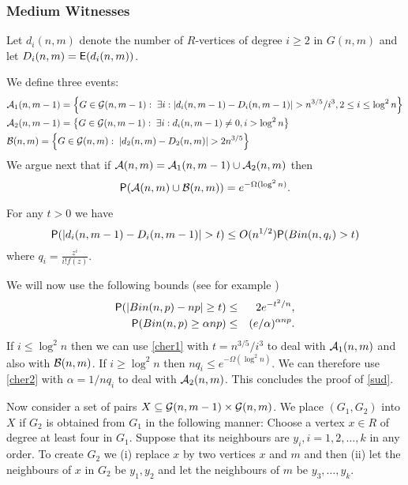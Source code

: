 \documentclass[11pt]{article}
\def\cA{{\cal A}}
\def\a{\alpha}
\newcommand{\set}[1]{\left\{#1\right\}}
\def\E{{\sf E}}
\def\Pr{{\sf P}}
\def\cB{{\cal B}}
\def\cG{{\cal G}}
\newcommand{\beq}[1]{\begin{equation}\label{#1}}
\newcommand{\eeq}{\end{equation}}
\def\go{{3/5}}
\begin{document}
\subsubsection{Medium Witnesses}
Let $d_i(n,m)$ denote the number of $R$-vertices of degree $i\geq 2$ in $G(n,m)$ and let $D_i(n,m)=\E(d_i(n,m))$.

We define three events: \begin{align}
&\cA_1(n,m-1)=\set{G\in \cG(n,m-1):\;\exists i:|d_i(n,m-1)-D_i(n,m-1)|> 
n^{\go}/i^3, 2\leq i\leq \log^2n}
\label{bad1}\\
&\cA_2(n,m-1)=\set{G\in \cG(n,m-1):\;\exists i:d_i(n,m-1)\neq 0, 
 i> \log^2n}
\label{bad1a}\\
&\cB(n,m)=\set{G\in \cG(n,m):\;|d_2(n,m)-D_2(n,m)|> 2n^{\go}}\label{bad2}
\end{align}
We argue next that if $\cA(n,m)=\cA_1(n,m-1)\cup\cA_2(n,m)$ then
\beq{sud}
\Pr(\cA(n,m)\cup \cB(n,m))=e^{-\Omega(\log^2n)}.
\eeq

For any $t>0$ we have
$$\Pr(|d_i(n,m-1)-D_i(n,m-1)|> t)\leq O(n^{1/2})\Pr(Bin(n,q_i) > t)$$
where $q_i=\frac{z^i}{i!f(z)}$.

We will now use the following bounds (see for example \cite{AS})
\begin{eqnarray}
\Pr(|Bin(n,p)-np|\geq t)&\leq& 2e^{-t^2/n},\label{cher1}\\
\Pr(Bin(n,p)\geq \a np)&\leq &(e/\a)^{\a np}.\label{cher2}
\end{eqnarray}
If $i\leq \log^2n$ then we can use \eqref{cher1} with $t=n^{\go}/i^3$ to deal with $\cA_1(n,m)$ and also with $\cB(n,m)$.
If $i\geq \log^2n$ then $nq_i\leq e^{-\Omega(\log^2n)}$. We can therefore use \eqref{cher2} with $\a=1/nq_i$ to deal with 
$\cA_2(n,m)$. This concludes the proof of \eqref{sud}.

Now consider a set of pairs $X\subseteq \cG(n,m-1)\times \cG(n,m)$. We place $(G_1,G_2)$ into $X$ if $G_2$ is obtained from $G_1$
in the following manner: Choose a vertex $x\in R$ of degree at least four in $G_1$. 
Suppose that its neighbours are $y_i,i=1,2,\ldots,k$
in any order. 
To create $G_2$ we (i) replace $x$ by two vertices $x$ and $m$ and then (ii) 
let the neighbours of $x$ in $G_2$ be $y_1,y_2$ and let the neighbours of $m$ be $y_3,\ldots,y_k$.
\end{document}

